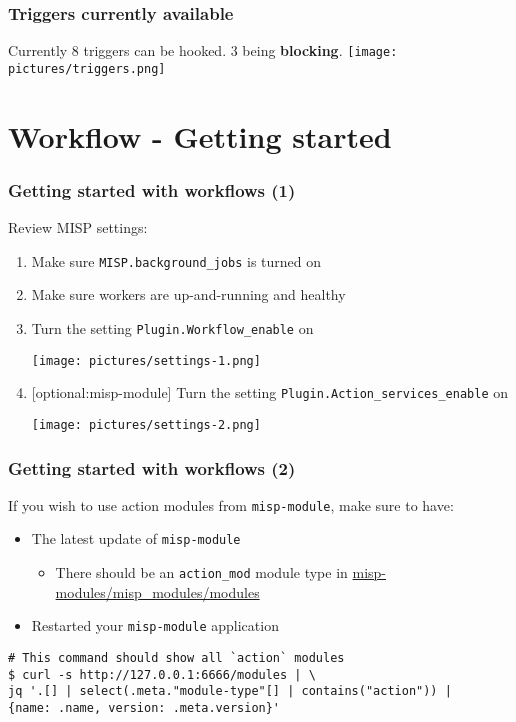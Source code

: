 \begin{frame}
    \frametitle{Triggers currently available}
    Currently 8 triggers can be hooked. 3 being \textbf{blocking}.
    \texttt{[image: pictures/triggers.png]}
\end{frame}

\section{Workflow - Getting started}
\begin{frame}
    \frametitle{Getting started with workflows (1)}
    Review MISP settings:
    \begin{enumerate}
        \item Make sure \texttt{MISP.background\_jobs} is turned on
        \item Make sure workers are up-and-running and healthy
        \item Turn the setting \texttt{Plugin.Workflow\_enable} on
        \begin{center}
            \texttt{[image: pictures/settings-1.png]}
        \end{center}
        \item {[optional:misp-module]} Turn the setting \texttt{Plugin.Action\_services\_enable} on
        \begin{center}
            \texttt{[image: pictures/settings-2.png]}
        \end{center}
    \end{enumerate}
\end{frame}

\begin{frame}[fragile]
    \frametitle{Getting started with workflows (2)}
    If you wish to use action modules from \texttt{misp-module}, make sure to have:
    \begin{itemize}
        \item The latest update of \texttt{misp-module}
        \begin{itemize}
            \item There should be an \texttt{action\_mod} module type in \url{misp-modules/misp\_modules/modules}
        \end{itemize}
        \item Restarted your \texttt{misp-module} application
    \end{itemize}
    \vspace{1em}
    \begin{lstlisting}[language=text,firstnumber=1]
# This command should show all `action` modules
$ curl -s http://127.0.0.1:6666/modules | \
jq '.[] | select(.meta."module-type"[] | contains("action")) | 
{name: .name, version: .meta.version}'
    \end{lstlisting}
\end{frame}

